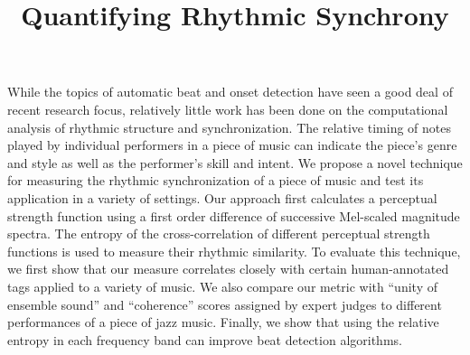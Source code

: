 \documentclass[12pt]{article}
\begin{document}
\title{Quantifying Rhythmic Synchrony}
\date{}

\maketitle

While the topics of automatic beat and onset detection have seen a good deal of recent research focus, relatively little work has been done on the computational analysis of rhythmic structure and synchronization.  The relative timing of notes played by individual performers in a piece of music can indicate the piece's genre and style as well as the performer's skill and intent.  We propose a novel technique for measuring the rhythmic synchronization of a piece of music and test its application in a variety of settings.  Our approach first calculates a perceptual strength function using a first order difference of successive Mel-scaled magnitude spectra.  The entropy of the cross-correlation of different perceptual strength functions is used to measure their rhythmic similarity.  To evaluate this technique, we first show that our measure correlates closely with certain human-annotated tags applied to a variety of music.  We also compare our metric with ``unity of ensemble sound'' and ``coherence'' scores assigned by expert judges to different performances of a piece of jazz music.  Finally, we show that using the relative entropy in each frequency band can improve beat detection algorithms.
\end{document}
